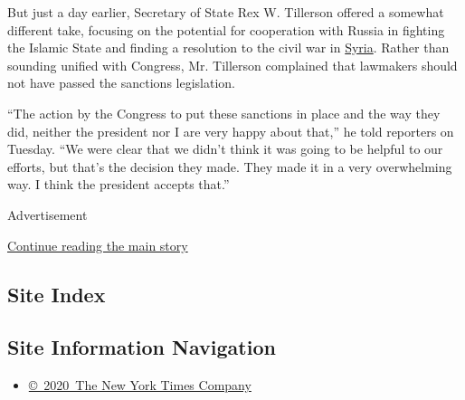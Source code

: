 But just a day earlier, Secretary of State Rex W. Tillerson offered a
somewhat different take, focusing on the potential for cooperation with
Russia in fighting the Islamic State and finding a resolution to the
civil war in
\href{https://www.nytimes.com/topic/destination/syria}{Syria}. Rather
than sounding unified with Congress, Mr. Tillerson complained that
lawmakers should not have passed the sanctions legislation.

``The action by the Congress to put these sanctions in place and the way
they did, neither the president nor I are very happy about that,'' he
told reporters on Tuesday. ``We were clear that we didn't think it was
going to be helpful to our efforts, but that's the decision they made.
They made it in a very overwhelming way. I think the president accepts
that.''

Advertisement

\protect\hyperlink{after-bottom}{Continue reading the main story}

\hypertarget{site-index}{%
\subsection{Site Index}\label{site-index}}

\hypertarget{site-information-navigation}{%
\subsection{Site Information
Navigation}\label{site-information-navigation}}

\begin{itemize}
\tightlist
\item
  \href{https://help.nytimes.com/hc/en-us/articles/115014792127-Copyright-notice}{©~2020~The
  New York Times Company}
\end{itemize}

